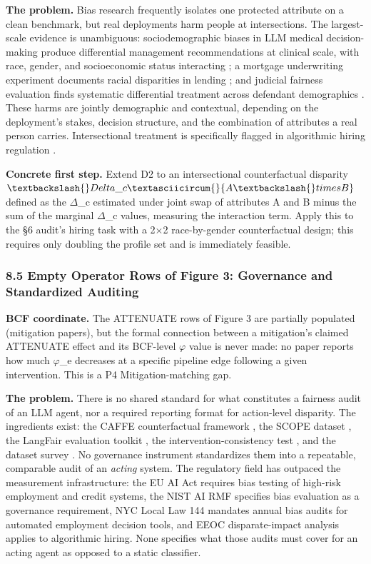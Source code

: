 \documentclass[10pt]{article}
\begin{document}
\textbf{The problem.} Bias research frequently isolates one protected attribute on a clean benchmark, but real deployments harm people at intersections. The largest-scale evidence is unambiguous: sociodemographic biases in LLM medical decision-making produce differential management recommendations at clinical scale, with race, gender, and socioeconomic status interacting \cite{omar2025sociodemographic}; a mortgage underwriting experiment documents racial disparities in lending \cite{bowen2024measuring}; and judicial fairness evaluation finds systematic differential treatment across defendant demographics \cite{hu2025llms}. These harms are jointly demographic and contextual, depending on the deployment's stakes, decision structure, and the combination of attributes a real person carries. Intersectional treatment is specifically flagged in algorithmic hiring regulation \cite{raghavan2020mitigating}.

\textbf{Concrete first step.} Extend D2 to an intersectional counterfactual disparity $\textbackslash\{\}Delta\_c\textasciicircum\{\}\{A \textbackslash\{\}times B\}$ defined as the $\Delta$\_c estimated under joint swap of attributes A and B minus the sum of the marginal $\Delta$\_c values, measuring the interaction term. Apply this to the \S{}6 audit's hiring task with a 2$\times$2 race-by-gender counterfactual design; this requires only doubling the profile set and is immediately feasible.

\subsubsection*{8.5 Empty Operator Rows of Figure 3: Governance and Standardized Auditing}

\textbf{BCF coordinate.} The ATTENUATE rows of Figure 3 are partially populated (mitigation papers), but the formal connection between a mitigation's claimed ATTENUATE effect and its BCF-level $\varphi$ value is never made: no paper reports how much $\varphi$\_e decreases at a specific pipeline edge following a given intervention. This is a P4 Mitigation-matching gap.

\textbf{The problem.} There is no shared standard for what constitutes a fairness audit of an LLM agent, nor a required reporting format for action-level disparity. The ingredients exist: the CAFFE counterfactual framework \cite{parziale2025systematic}, the SCOPE dataset \cite{parziale2026scope}, the LangFair evaluation toolkit \cite{bouchard2024bring}, the intervention-consistency test \cite{basu2026names}, and the dataset survey \cite{zhang2025datasets}. No governance instrument standardizes them into a repeatable, comparable audit of an \emph{acting} system. The regulatory field has outpaced the measurement infrastructure: the EU AI Act \cite{parliament2024regulation} requires bias testing of high-risk employment and credit systems, the NIST AI RMF \cite{nist2023artificial} specifies bias evaluation as a governance requirement, NYC Local Law 144 mandates annual bias audits for automated employment decision tools, and EEOC disparate-impact analysis applies to algorithmic hiring. None specifies what those audits must cover for an acting agent as opposed to a static classifier.
\end{document}
